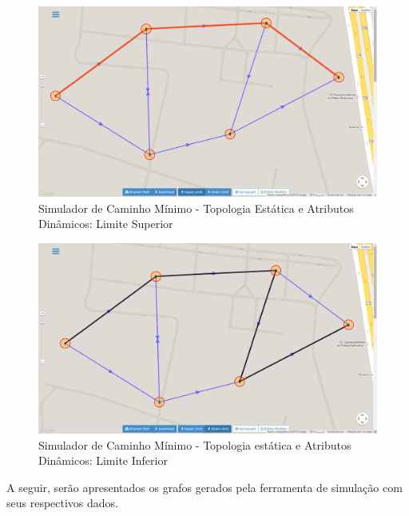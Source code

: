 \begin{figure}[htbp]
\centering
 \includegraphics[width=.90\textwidth]{chapters/fig/upperlimit.png}
\caption{Simulador de Caminho Mínimo - Topologia Estática e Atributos Dinâmicos: Limite Superior}
\label{fig:upperlimit}
\end{figure}
\FloatBarrier

\begin{figure}[htbp]
\centering
 \includegraphics[width=.90\textwidth]{chapters/fig/downlimit.png}
\caption{Simulador de Caminho Mínimo - Topologia estática e Atributos Dinâmicos: Limite Inferior}
\label{fig:downlimit}
\end{figure}
\FloatBarrier

A seguir, serão apresentados os grafos gerados pela ferramenta de simulação com seus respectivos dados.
